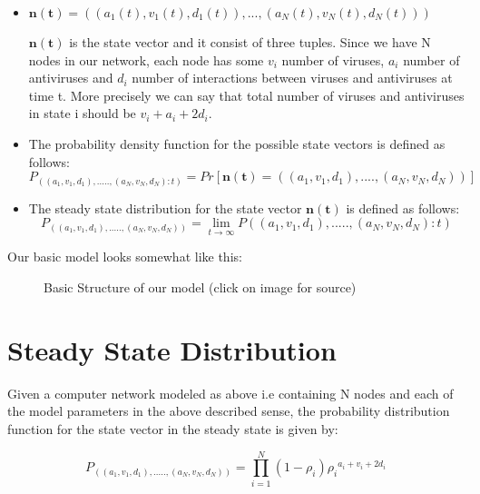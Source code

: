 \begin{itemize}
\item
$\mathbf{n(t)}=((a_1(t),v_1(t),d_1(t)),...,(a_N(t),v_N(t),d_N(t)))$ 

$\mathbf{n(t)}$ is the state vector and it consist of three tuples. Since we have N nodes in our network, each node has some $v_i$ number of viruses, $a_i$ number of antiviruses and $d_i$ number of interactions between viruses and antiviruses at time t. More precisely we can say that total number of viruses and antiviruses in state i should be $v_i+a_i+2d_i$.

\item  The probability density function for the possible state vectors is defined as follows:
$P_{((a_1,v_1,d_1),.....,(a_N,v_N,d_N):t)} = Pr[\mathbf{n(t)}=((a_1,v_1,d_1),....,(a_N,v_N,d_N))]$

\item The steady state distribution for the state vector $\mathbf{n(t)}$ is defined as follows:
$$P_{((a_1,v_1,d_1),.....,(a_N,v_N,d_N))} = \lim_{t\to\infty} P((a_1,v_1,d_1),.....,(a_N,v_N,d_N):t)$$

\end{itemize}

Our basic model looks somewhat like this: 

\begin{figure}[H]
		\href{https://www.netlab.tkk.fi/opetus/s383143/kalvot/E_qnets.pdf}
		{}
		\caption{{Basic Structure of our model (click on image for source)}}
		\label{fig:figh}
\end{figure}

\section{Steady State Distribution}

\begin{theorem}
Given a computer network modeled as above i.e containing N nodes and each of the model parameters in the above described sense, the probability distribution function for the state vector in the steady state is given by:

$$P_{((a_1,v_1,d_1),.....,(a_N,v_N,d_N))} =      \prod_{i=1}^{N} (1-\rho_i){{\rho_i}^{a_i+v_i+2d_i}} $$
\end{theorem}

